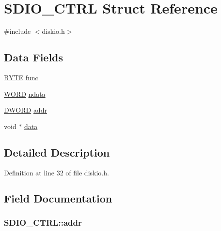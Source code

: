 \hypertarget{structSDIO__CTRL}{}\section{S\+D\+I\+O\+\_\+\+C\+T\+RL Struct Reference}
\label{structSDIO__CTRL}


{\ttfamily \#include $<$diskio.\+h$>$}

\subsection*{Data Fields}
\begin{DoxyCompactItemize}
\item 
\hyperlink{integer_8h_a4ae1dab0fb4b072a66584546209e7d58}{B\+Y\+TE} \hyperlink{structSDIO__CTRL_a2f0a17848a6c7c58f826d1888469e6e3}{func}
\item 
\hyperlink{integer_8h_a197942eefa7db30960ae396d68339b97}{W\+O\+RD} \hyperlink{structSDIO__CTRL_a44edc7d37688ac4f3a1ba3d66e909767}{ndata}
\item 
\hyperlink{integer_8h_ad342ac907eb044443153a22f964bf0af}{D\+W\+O\+RD} \hyperlink{structSDIO__CTRL_a15025848d3f3733f366504d30a1d9bb2}{addr}
\item 
void $\ast$ \hyperlink{structSDIO__CTRL_ab04c9adb4d3027a14925fb30b469f0c0}{data}
\end{DoxyCompactItemize}


\subsection{Detailed Description}


Definition at line 32 of file diskio.\+h.



\subsection{Field Documentation}
\subsubsection[{\texorpdfstring{addr}{addr}}]{ S\+D\+I\+O\+\_\+\+C\+T\+R\+L\+::addr}\hypertarget{structSDIO__CTRL_a15025848d3f3733f366504d30a1d9bb2}{}\label{structSDIO__CTRL_a15025848d3f3733f366504d30a1d9bb2}


